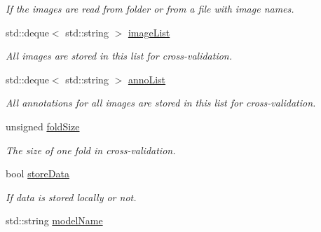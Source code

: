 \begin{DoxyCompactItemize}
\begin{DoxyCompactList}\small\item\em If the images are read from folder or from a file with image names. \item\end{DoxyCompactList}\item 
\hypertarget{classclassifyImages_aeec5f75ad89527ac01d0e5f7ffa156e3}{
std::deque$<$ std::string $>$ \hyperlink{classclassifyImages_aeec5f75ad89527ac01d0e5f7ffa156e3}{imageList}}
\label{classclassifyImages_aeec5f75ad89527ac01d0e5f7ffa156e3}

\begin{DoxyCompactList}\small\item\em All images are stored in this list for cross-\/validation. \item\end{DoxyCompactList}\item 
\hypertarget{classclassifyImages_af6d04360d7d143aab8e258c5559e47e9}{
std::deque$<$ std::string $>$ \hyperlink{classclassifyImages_af6d04360d7d143aab8e258c5559e47e9}{annoList}}
\label{classclassifyImages_af6d04360d7d143aab8e258c5559e47e9}

\begin{DoxyCompactList}\small\item\em All annotations for all images are stored in this list for cross-\/validation. \item\end{DoxyCompactList}\item 
\hypertarget{classclassifyImages_ace5a069d7244c608ae2d2e29fc567c24}{
unsigned \hyperlink{classclassifyImages_ace5a069d7244c608ae2d2e29fc567c24}{foldSize}}
\label{classclassifyImages_ace5a069d7244c608ae2d2e29fc567c24}

\begin{DoxyCompactList}\small\item\em The size of one fold in cross-\/validation. \item\end{DoxyCompactList}\item 
\hypertarget{classclassifyImages_a0b4d9fa519372eeb192297c3d9521d3f}{
bool \hyperlink{classclassifyImages_a0b4d9fa519372eeb192297c3d9521d3f}{storeData}}
\label{classclassifyImages_a0b4d9fa519372eeb192297c3d9521d3f}

\begin{DoxyCompactList}\small\item\em If data is stored locally or not. \item\end{DoxyCompactList}\item 
\hypertarget{classclassifyImages_adefaf64a0bbe772b9463fa2a9cba904e}{
std::string \hyperlink{classclassifyImages_adefaf64a0bbe772b9463fa2a9cba904e}{modelName}}
\label{classclassifyImages_adefaf64a0bbe772b9463fa2a9cba904e}


\end{DoxyCompactItemize}
